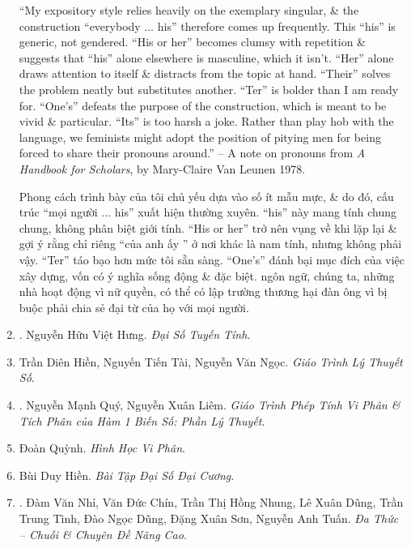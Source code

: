 \documentclass{article}
\begin{document}
\begin{enumerate}
	``My expository style relies heavily on the exemplary singular, \& the construction ``everybody $\ldots$ his'' therefore comes up frequently. This ``his'' is	generic, not gendered. ``His or her'' becomes clumsy with repetition \& suggests that ``his'' alone elsewhere is masculine, which it isn't. ``Her'' alone draws attention to itself \& distracts from the topic at hand. ``Their'' solves the problem neatly but substitutes another. ``Ter'' is bolder than I am ready for. ``One's'' defeats the purpose of the construction, which is meant to be vivid \& particular. ``Its'' is too harsh a joke. Rather than play hob with the language, we feminists might adopt the position of pitying men for being forced to share their pronouns around.'' -- A note on pronouns from {\it A Handbook for Scholars}, by {\sc Mary-Claire Van Leunen} 1978.
	
	Phong cách trình bày của tôi chủ yếu dựa vào số ít mẫu mực, \& do đó, cấu trúc ``mọi người $\ldots$ his'' xuất hiện thường xuyên. ``his'' này mang tính chung chung, không phân biệt giới tính. ``His or her'' trở nên vụng về khi lặp lại \& gợi ý rằng chỉ riêng ``của anh ấy '' ở nơi khác là nam tính, nhưng không phải vậy. ``Ter'' táo bạo hơn mức tôi sẵn sàng. ``One's'' đánh bại mục đích của việc xây dựng, vốn có ý nghĩa sống động \& đặc biệt. ngôn ngữ, chúng ta, những nhà hoạt động vì nữ quyền, có thể có lập trường thương hại đàn ông vì bị buộc phải chia sẻ đại từ của họ với mọi người.
	
	\item \cite{Hung_linear_algebra}. {\sc Nguyễn Hữu Việt Hưng}. {\it Đại Số Tuyến Tính}.\hfill{\sf[reading]}
	
	\item Trần Diên Hiền, Nguyến Tiến Tài, Nguyễn Văn Ngọc. {\it Giáo Trình Lý Thuyết Số}.
	
	\item \cite{Quy_Liem2012}. Nguyễn Mạnh Quý, Nguyễn Xuân Liêm. {\it Giáo Trình Phép Tính Vi Phân \& Tích Phân của Hàm 1 Biến Số: Phần Lý Thuyết}.\hfill{\sf[reading]}
	
	\item Đoàn Quỳnh. {\it Hình Học Vi Phân}.
	
	\item Bùi Duy Hiền. {\it Bài Tập Đại Số Đại Cương}.
	
	\item \cite{Nhi_Chin_Dung_Dung_Tinh_Dung_Son_Tuan2017}. Đàm Văn Nhỉ, Văn Đức Chín, Trần Thị Hồng Nhung, Lê Xuân Dũng, Trần Trung Tình, Đào Ngọc Dũng, Đặng Xuân Sơn, Nguyễn Anh Tuấn. {\it Đa Thức -- Chuỗi \& Chuyên Đề Nâng Cao}.
	

\end{enumerate}
\end{document}
